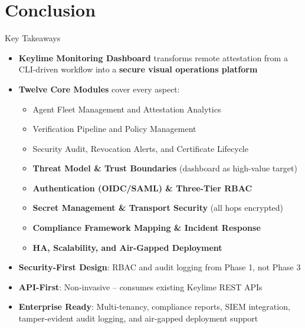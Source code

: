 \section{Conclusion}

\begin{frame}{Key Takeaways}
  \begin{itemize}
    \item \textbf{Keylime Monitoring Dashboard} transforms remote attestation from
          a CLI-driven workflow into a \textbf{secure visual operations platform}
    \item \textbf{Twelve Core Modules} cover every aspect:
    \begin{itemize}
      \scriptsize
      \item Agent Fleet Management and Attestation Analytics
      \item Verification Pipeline and Policy Management
      \item Security Audit, Revocation Alerts, and Certificate Lifecycle
      \item \textbf{Threat Model \& Trust Boundaries} (dashboard as high-value target)
      \item \textbf{Authentication (OIDC/SAML) \& Three-Tier RBAC}
      \item \textbf{Secret Management \& Transport Security} (all hops encrypted)
      \item \textbf{Compliance Framework Mapping \& Incident Response}
      \item \textbf{HA, Scalability, and Air-Gapped Deployment}
    \end{itemize}
    \item \textbf{Security-First Design}: RBAC and audit logging from Phase 1, not Phase 3
    \item \textbf{API-First}: Non-invasive -- consumes existing Keylime REST APIs
    \item \textbf{Enterprise Ready}: Multi-tenancy, compliance reports, SIEM integration,
          tamper-evident audit logging, and air-gapped deployment support
  \end{itemize}
\end{frame}

